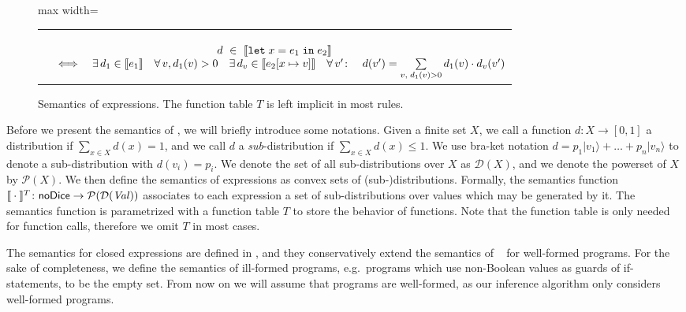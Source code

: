 \begin{figure}
\begin{center}
\begin{adjustbox}{max width=\textwidth}
\begin{tabular}{c@{\qquad}c}
					\multicolumn{2}{c}{ 
						\renewcommand{\arraystretch}{1.2}
						$\begin{matrix}
							\phantom{space maker}\\
							d ~{}\in{}~ \llbracket \texttt{let}\; x = e_1 \;\texttt{in}\; e_2 \rrbracket\\
							\quad{}\Longleftrightarrow{}\quad 
							\exists\, d_1 \in \llbracket e_1 \rrbracket~{}~{}~
							\forall\, v, d_1(v) > 0~{}~{}~
							\exists\, d_v \in \llbracket e_2[x \mapsto v] \rrbracket~{}~{}~
							\forall\, v'\colon \quad
							d(v') = \sum\limits_{v,\; d_1(v) > 0 } d_1(v) \cdot d_{v}(v')
						\end{matrix}$
					}
						\end{tabular}
			\end{adjustbox}
		\end{center}
	\caption{Semantics of \NDICE expressions. The function table $T$ is left implicit in most rules.}
	\label{fig:semantics} 
\end{figure}




Before we present the semantics of \NDICE, we will briefly introduce some notations. 
Given a finite set $X$, we call a function $d \colon X \rightarrow [0,1]$ a distribution if $\sum_{x \in X} d(x) = 1$, and we call $d$ a \textit{sub}-distribution if $\sum_{x \in X} d(x) \leq 1$. 
We use bra-ket notation $d = p_1{| v_1 \rangle} + {\ldots} +  p_n {|v_n \rangle}$ to denote a sub-distribution with $d(v_i) = p_i$.
We denote the set of all sub-distributions over $X$ as $\mathcal{D}(X)$, and we denote the powerset of $X$ by $\mathcal{P}(X)$.
%
We then define the semantics of \NDICE expressions as convex sets of (sub-)distributions.
Formally, the semantics function $\llbracket \:\cdot\: \rrbracket^T\colon \textsf{\upshape {\mbox{noDice}}} \rightarrow  \mathcal{P}(\mathcal{D}(\mathit{Val}))$ associates to each \NDICE expression a set of sub-distributions over values which may be generated by it.
The semantics function is parametrized with a function table $T$ to store the behavior of functions.
Note that the function table is only needed for function calls, therefore we omit $T$ in most cases.

The semantics for closed \NDICE expressions are defined in , and they conservatively extend the semantics of \DICE~\cite{holtzen2020scaling} for well-formed programs.
For the sake of completeness, we define the semantics of ill-formed programs, e.g.\ programs which use non-Boolean values as guards of if-statements, to be the empty set.
From now on we will assume that programs are well-formed, as our inference algorithm only considers well-formed programs.

